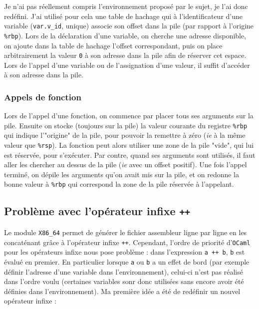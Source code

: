 \documentclass{scrartcl}
\begin{document}
Je n'ai pas réellement compris l'environnement proposé par le sujet, je l'ai donc redéfini. J'ai utilisé pour cela une table de hachage qui à l'identificateur d'une variable (\texttt{var.v\_id}, unique) associe son offset dans la pile (par rapport à l'origine \texttt{\%rbp}). Lors de la déclaration d'une variable, on cherche une adresse disponible, on ajoute dans la table de hachage l'offset correspondant, puis on place arbitrairement la valeur \texttt{0} à son adresse dans la pile afin de réserver cet espace. Lors de l'appel d'une variable ou de l'assignation d'une valeur, il suffit d'accéder à son adresse dans la pile.

\subsubsection*{Appels de fonction}

Lors de l'appel d'une fonction, on commence par placer tous ses arguments sur la pile. Ensuite on stocke (toujours sur la pile) la valeur courante du registre \texttt{\%rbp} qui indique l'"origine" de la pile, pour pouvoir la remettre à zéro (\textit{ie} à la même valeur que \texttt{\%rsp}). La fonction peut alors utiliser une zone de la pile "vide", qui lui est réservée, pour s'exécuter. Par contre, quand ses arguments sont utilisés, il faut aller les chercher au dessus de la pile (\textit{ie} avec un offset positif). Une fois l'appel terminé, on dépile les arguments qu'on avait mis sur la pile, et on redonne la bonne valeur à \texttt{\%rbp} qui correspond la zone de la pile réservée à l'appelant.



\subsection{Problème avec l'opérateur infixe \texttt{++}}

Le module \texttt{X86\_64} permet de générer le fichier assembleur ligne par ligne en les concaténant grâce à l'opérateur infixe \texttt{++}. Cependant, l'ordre de priorité d'\texttt{OCaml} pour les opérateurs infixe nous pose problème : dans l'expression \texttt{a ++ b}, \texttt{b} est évalué en premier. En particulier lorsque \texttt{a} ou \texttt{b} a un effet de bord (par exemple définir l'adresse d'une variable dans l'environnement), celui-ci n'est pas réalisé dans l'ordre voulu (certaines variables sonr donc utilisées sans encore avoir été définies dans l'environnement). Ma première idée a été de redéfinir un nouvel opérateur infixe :
\end{document}
